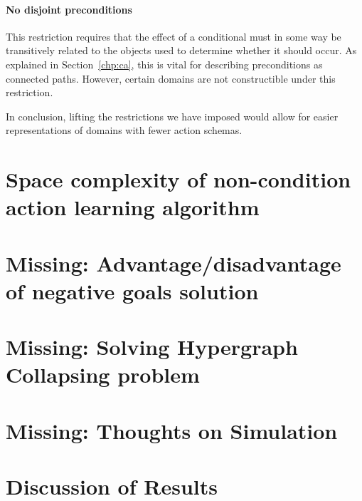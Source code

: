 \documentclass[Master.tex]{subfiles}
\begin{document}
\paragraph{No disjoint preconditions}
This restriction requires that the effect of a conditional must in some way be transitively related to the objects used to determine whether it should occur. As explained in Section~\ref{chp:ca}, this is vital for describing preconditions as connected paths. However, certain domains are not constructible under this restriction. 


In conclusion, lifting the restrictions we have imposed would allow for easier representations of domains with fewer action schemas. 

\section{Space complexity of non-condition action learning algorithm}


\section{Missing: Advantage/disadvantage of negative goals solution}

\section{Missing: Solving Hypergraph Collapsing problem}

\section{Missing: Thoughts on Simulation}

\section{Discussion of Results}\label{sec:disc:results}
   
%
%    
%
%    
\end{document}
